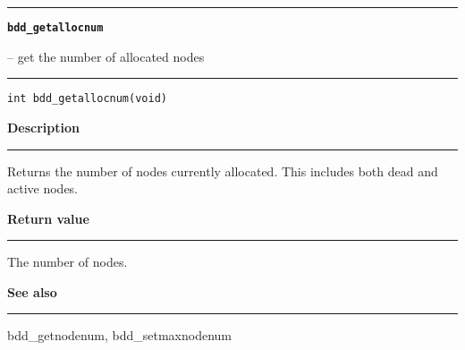 \vspace{8ex}
\begin{minipage}{\textwidth}

\noindent\begin{minipage}{\textwidth}
\rule{\textwidth}{0.5mm}
{\tt\bf bdd\_getallocnum }
\--- get the number of allocated nodes  \hspace{\fill}
\\\rule[1.5ex]{\textwidth}{0.5mm}
\end{minipage}

\noindent\begin{verbatim}
int bdd_getallocnum(void) 
\end{verbatim}

\vspace{\parsep}\noindent
{\bf Description}\\\rule[1.5ex]{\textwidth}{0.2mm}\vspace{-1.5ex}\setlength{\parindent}{1em}
Returns the number of nodes currently allocated. This includes
           both dead and active nodes. 

\setlength{\parindent}{0em}\vspace{\parsep}\vspace{\baselineskip}\noindent
{\bf Return value}\\\rule[1.5ex]{\textwidth}{0.2mm}\vspace{-1.5ex}
The number of nodes. 

\vspace{\parsep}\vspace{\baselineskip}\noindent
{\bf See also}\\\rule[1.5ex]{\textwidth}{0.2mm}\vspace{-1.5ex}
bdd\_getnodenum, bdd\_setmaxnodenum 
\end{minipage}
\vspace{8ex}
